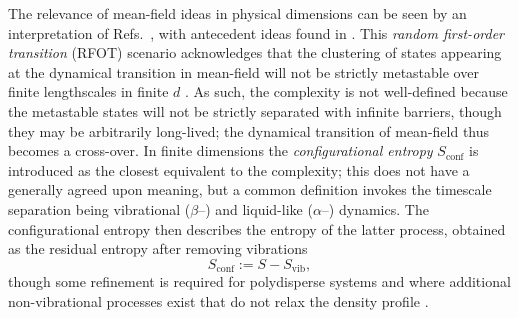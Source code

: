 \documentclass[11pt,twoside]{report}
\begin{document}
The relevance of mean-field ideas in physical dimensions can be seen by an interpretation of Refs.\ \cite{KirkpatrickPRB1987,HallJCP1987,KirkpatrickPRA1989}, with antecedent ideas found in \cite{KauzmannCR1948,AdamJCP1965}.
This \emph{random first-order transition} (RFOT) scenario acknowledges that the clustering of states appearing at the dynamical transition in mean-field will not be strictly metastable over finite lengthscales in finite $d$ \cite{BouchaudJCP2004,MontanariJSP2006}.
As such, the complexity is not well-defined because the metastable states will not be strictly separated with infinite barriers, though they may be arbitrarily long-lived; the dynamical transition of mean-field thus becomes a cross-over.
In finite dimensions the \emph{configurational entropy} $S_\mathrm{conf}$ is introduced as the closest equivalent to the complexity; this does not have a generally agreed upon meaning, but a common definition invokes the timescale separation being vibrational ($\beta$--) and liquid-like ($\alpha$--) dynamics.
The configurational entropy then describes the entropy of the latter process, obtained as the residual entropy after removing vibrations
\begin{equation}\label{eq:sconf}
  S_\mathrm{conf} := S - S_\mathrm{vib},
\end{equation}
though some refinement is required for polydisperse systems \cite{OzawaJCP2017,OzawaJCP2018} and where additional non-vibrational processes exist that do not relax the density profile \cite{OzawaPRL2018}.
\end{document}
